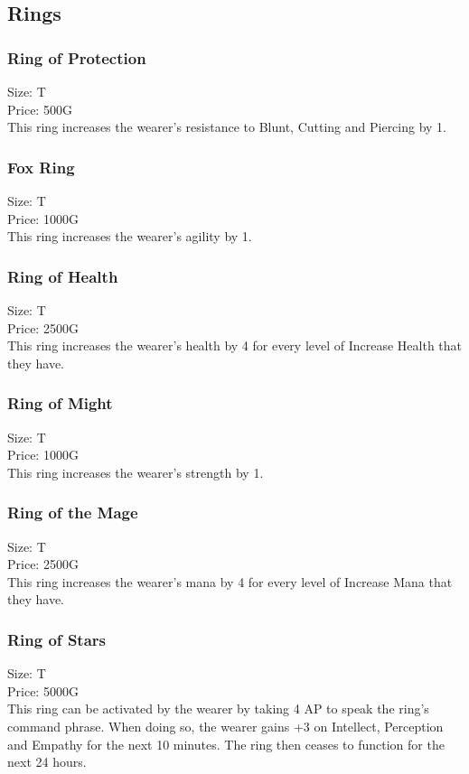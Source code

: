 \subsection{Rings}\label{subsec:rings}

\subsubsection{Ring of Protection}\label{item:ringOfProtection}
Size: T\\
Price: 500G\\
This ring increases the wearer's resistance to Blunt, Cutting and Piercing by 1.

\subsubsection{Fox Ring}\label{item:ringOfFox}
Size: T\\
Price: 1000G\\
This ring increases the wearer's agility by 1.

\subsubsection{Ring of Health}\label{item:ringOfHealth}
Size: T\\
Price: 2500G\\
This ring increases the wearer's health by 4 for every level of Increase Health that they have.

\subsubsection{Ring of Might}\label{item:ringOfMight}
Size: T\\
Price: 1000G\\
This ring increases the wearer's strength by 1.

\subsubsection{Ring of the Mage}\label{item:ringOfMage}
Size: T\\
Price: 2500G\\
This ring increases the wearer's mana by 4 for every level of Increase Mana that they have.

\subsubsection{Ring of Stars}\label{item:ringOfStars}
Size: T\\
Price: 5000G\\
This ring can be activated by the wearer by taking 4 AP to speak the ring's command phrase.
When doing so, the wearer gains +3 on Intellect, Perception and Empathy for the next 10 minutes.
The ring then ceases to function for the next 24 hours.